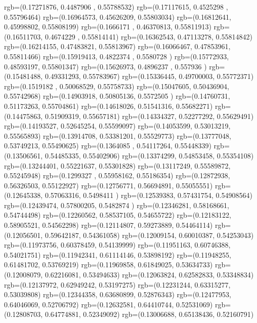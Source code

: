 {{{		  rgb=(0.17271876,  0.4487906 ,  0.55788532)
		  rgb=(0.17117615,  0.4525298 ,  0.55796464)
		  rgb=(0.16964573,  0.45626209,  0.55803034)
		  rgb=(0.16812641,  0.45998802,  0.55808199)
		  rgb=(0.1666171 ,  0.46370813,  0.55811913)
		  rgb=(0.16511703,  0.4674229 ,  0.55814141)
		  rgb=(0.16362543,  0.47113278,  0.55814842)
		  rgb=(0.16214155,  0.47483821,  0.55813967)
		  rgb=(0.16066467,  0.47853961,  0.55811466)
		  rgb=(0.15919413,  0.4822374 ,  0.5580728 )
		  rgb=(0.15772933,  0.48593197,  0.55801347)
		  rgb=(0.15626973,  0.4896237 ,  0.557936  )
		  rgb=(0.15481488,  0.49331293,  0.55783967)
		  rgb=(0.15336445,  0.49700003,  0.55772371)
		  rgb=(0.1519182 ,  0.50068529,  0.55758733)
		  rgb=(0.15047605,  0.50436904,  0.55742968)
		  rgb=(0.14903918,  0.50805136,  0.5572505 )
		  rgb=(0.14760731,  0.51173263,  0.55704861)
		  rgb=(0.14618026,  0.51541316,  0.55682271)
		  rgb=(0.14475863,  0.51909319,  0.55657181)
		  rgb=(0.14334327,  0.52277292,  0.55629491)
		  rgb=(0.14193527,  0.52645254,  0.55599097)
		  rgb=(0.14053599,  0.53013219,  0.55565893)
		  rgb=(0.13914708,  0.53381201,  0.55529773)
		  rgb=(0.13777048,  0.53749213,  0.55490625)
		  rgb=(0.1364085 ,  0.54117264,  0.55448339)
		  rgb=(0.13506561,  0.54485335,  0.55402906)
		  rgb=(0.13374299,  0.54853458,  0.55354108)
		  rgb=(0.13244401,  0.55221637,  0.55301828)
		  rgb=(0.13117249,  0.55589872,  0.55245948)
		  rgb=(0.1299327 ,  0.55958162,  0.55186354)
		  rgb=(0.12872938,  0.56326503,  0.55122927)
		  rgb=(0.12756771,  0.56694891,  0.55055551)
		  rgb=(0.12645338,  0.57063316,  0.5498411 )
		  rgb=(0.12539383,  0.57431754,  0.54908564)
		  rgb=(0.12439474,  0.57800205,  0.5482874 )
		  rgb=(0.12346281,  0.58168661,  0.54744498)
		  rgb=(0.12260562,  0.58537105,  0.54655722)
		  rgb=(0.12183122,  0.58905521,  0.54562298)
		  rgb=(0.12114807,  0.59273889,  0.54464114)
		  rgb=(0.12056501,  0.59642187,  0.54361058)
		  rgb=(0.12009154,  0.60010387,  0.54253043)
		  rgb=(0.11973756,  0.60378459,  0.54139999)
		  rgb=(0.11951163,  0.60746388,  0.54021751)
		  rgb=(0.11942341,  0.61114146,  0.53898192)
		  rgb=(0.11948255,  0.61481702,  0.53769219)
		  rgb=(0.11969858,  0.61849025,  0.53634733)
		  rgb=(0.12008079,  0.62216081,  0.53494633)
		  rgb=(0.12063824,  0.62582833,  0.53348834)
		  rgb=(0.12137972,  0.62949242,  0.53197275)
		  rgb=(0.12231244,  0.63315277,  0.53039808)
		  rgb=(0.12344358,  0.63680899,  0.52876343)
		  rgb=(0.12477953,  0.64046069,  0.52706792)
		  rgb=(0.12632581,  0.64410744,  0.52531069)
		  rgb=(0.12808703,  0.64774881,  0.52349092)
		  rgb=(0.13006688,  0.65138436,  0.52160791)
}}}
